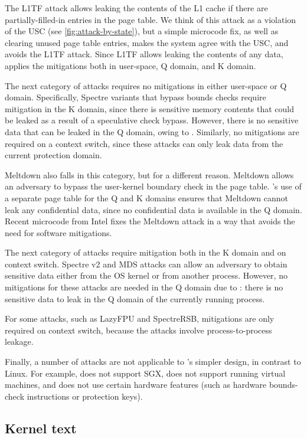 The L1TF attack allows leaking the contents of the L1 cache if
there are partially-filled-in entries in the page table.  We think of
this attack as a violation of the USC (see \autoref{fig:attack-by-state}),
but a simple microcode fix, as well as clearing unused page table entries,
makes the system agree with the USC, and avoids the L1TF attack.  Since
L1TF allows leaking the contents of any data, \sys applies the mitigations
both in user-space, Q domain, and K domain.

The next category of attacks requires no mitigations in either user-space
or Q domain.  Specifically, Spectre variants that bypass bounds checks
require mitigation in the K domain, since there is sensitive memory
contents that could be leaked as a result of a speculative check bypass.
However, there is no sensitive data that can be leaked in the Q domain,
owing to \contract{}.  Similarly, no mitigations are required on a
context switch, since these attacks can only leak data from the current
protection domain.

Meltdown also falls in this category, but for a different reason.
Meltdown allows an adversary to bypass the user-kernel boundary check
in the page table.  \sys's use of a separate page table for the Q and
K domains ensures that Meltdown cannot leak any confidential data, since
no confidential data is available in the Q domain.  Recent microcode
from Intel fixes the Meltdown attack in a way that avoids the need for
software mitigations.

The next category of attacks require mitigation both in the K domain and
on context switch.  Spectre v2 and MDS attacks can allow an adversary to
obtain sensitive data either from the OS kernel or from another process.
However, no mitigations for these attacks are needed in the Q domain
due to \contract{}: there is no sensitive data to leak in the Q domain
of the currently running process.

For some attacks, such as LazyFPU and SpectreRSB, mitigations are only
required on context switch, because the attacks involve process-to-process
leakage.

Finally, a number of attacks are not applicable to \sys's simpler design,
in contrast to Linux.  For example, \sys does not support SGX, does
not support running virtual machines, and does not use certain hardware
features (such as hardware bounds-check instructions or protection keys).


\subsection{Kernel text}
\label{ss:ktext}

